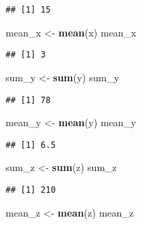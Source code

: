 \documentclass[
]{book}
\newenvironment{Shaded}{\begin{snugshade}}{\end{snugshade}}
\newcommand{\FunctionTok}[1]{\textcolor[rgb]{0.13,0.29,0.53}{\textbf{#1}}}
\newcommand{\NormalTok}[1]{#1}
\newcommand{\OtherTok}[1]{\textcolor[rgb]{0.56,0.35,0.01}{#1}}
\theoremstyle{definition}
\theoremstyle{definition}
\theoremstyle{definition}
\theoremstyle{definition}
\theoremstyle{remark}
\begin{document}
\begin{verbatim}
## [1] 15
\end{verbatim}

\begin{Shaded}
\begin{Highlighting}[]
\NormalTok{mean\_x }\OtherTok{\textless{}{-}} \FunctionTok{mean}\NormalTok{(x)}
\NormalTok{mean\_x}
\end{Highlighting}
\end{Shaded}

\begin{verbatim}
## [1] 3
\end{verbatim}

\begin{Shaded}
\begin{Highlighting}[]
\NormalTok{sum\_y }\OtherTok{\textless{}{-}} \FunctionTok{sum}\NormalTok{(y)}
\NormalTok{sum\_y}
\end{Highlighting}
\end{Shaded}

\begin{verbatim}
## [1] 78
\end{verbatim}

\begin{Shaded}
\begin{Highlighting}[]
\NormalTok{mean\_y }\OtherTok{\textless{}{-}} \FunctionTok{mean}\NormalTok{(y)}
\NormalTok{mean\_y}
\end{Highlighting}
\end{Shaded}

\begin{verbatim}
## [1] 6.5
\end{verbatim}

\begin{Shaded}
\begin{Highlighting}[]
\NormalTok{sum\_z }\OtherTok{\textless{}{-}} \FunctionTok{sum}\NormalTok{(z)}
\NormalTok{sum\_z}
\end{Highlighting}
\end{Shaded}

\begin{verbatim}
## [1] 210
\end{verbatim}

\begin{Shaded}
\begin{Highlighting}[]
\NormalTok{mean\_z }\OtherTok{\textless{}{-}} \FunctionTok{mean}\NormalTok{(z)}
\NormalTok{mean\_z}
\end{Highlighting}
\end{Shaded}
\end{document}

